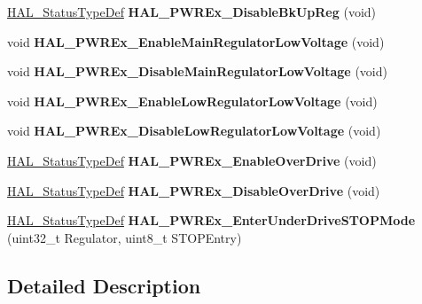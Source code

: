 \begin{DoxyCompactItemize}
\mbox{\label{group___p_w_r_ex___exported___functions___group1_gae1b50407389e3ce1132eceb013f823d1}} 
\mbox{\hyperlink{stm32f7xx__hal__def_8h_a63c0679d1cb8b8c684fbb0632743478f}{H\+A\+L\+\_\+\+Status\+Type\+Def}} {\bfseries H\+A\+L\+\_\+\+P\+W\+R\+Ex\+\_\+\+Disable\+Bk\+Up\+Reg} (void)
\item 
\mbox{\label{group___p_w_r_ex___exported___functions___group1_ga87be678272b0c42e99168e6eba8eba1b}} 
void {\bfseries H\+A\+L\+\_\+\+P\+W\+R\+Ex\+\_\+\+Enable\+Main\+Regulator\+Low\+Voltage} (void)
\item 
\mbox{\label{group___p_w_r_ex___exported___functions___group1_gae99048e691f076b48d10ea34d90410b2}} 
void {\bfseries H\+A\+L\+\_\+\+P\+W\+R\+Ex\+\_\+\+Disable\+Main\+Regulator\+Low\+Voltage} (void)
\item 
\mbox{\label{group___p_w_r_ex___exported___functions___group1_gad40f6ad33641706995cde2d1cf69c12d}} 
void {\bfseries H\+A\+L\+\_\+\+P\+W\+R\+Ex\+\_\+\+Enable\+Low\+Regulator\+Low\+Voltage} (void)
\item 
\mbox{\label{group___p_w_r_ex___exported___functions___group1_ga018ead4ad78fb4f5e271ac7c155ec7c2}} 
void {\bfseries H\+A\+L\+\_\+\+P\+W\+R\+Ex\+\_\+\+Disable\+Low\+Regulator\+Low\+Voltage} (void)
\item 
\mbox{\label{group___p_w_r_ex___exported___functions___group1_gaaf092495bffd53ad2fe6a91f90f87032}} 
\mbox{\hyperlink{stm32f7xx__hal__def_8h_a63c0679d1cb8b8c684fbb0632743478f}{H\+A\+L\+\_\+\+Status\+Type\+Def}} {\bfseries H\+A\+L\+\_\+\+P\+W\+R\+Ex\+\_\+\+Enable\+Over\+Drive} (void)
\item 
\mbox{\label{group___p_w_r_ex___exported___functions___group1_ga6f554749076c25dfc33b9cebb0408780}} 
\mbox{\hyperlink{stm32f7xx__hal__def_8h_a63c0679d1cb8b8c684fbb0632743478f}{H\+A\+L\+\_\+\+Status\+Type\+Def}} {\bfseries H\+A\+L\+\_\+\+P\+W\+R\+Ex\+\_\+\+Disable\+Over\+Drive} (void)
\item 
\mbox{\label{group___p_w_r_ex___exported___functions___group1_ga46be5e3415921800ca13015da2a0b301}} 
\mbox{\hyperlink{stm32f7xx__hal__def_8h_a63c0679d1cb8b8c684fbb0632743478f}{H\+A\+L\+\_\+\+Status\+Type\+Def}} {\bfseries H\+A\+L\+\_\+\+P\+W\+R\+Ex\+\_\+\+Enter\+Under\+Drive\+S\+T\+O\+P\+Mode} (uint32\+\_\+t Regulator, uint8\+\_\+t S\+T\+O\+P\+Entry)
\end{DoxyCompactItemize}


\subsection{Detailed Description}
